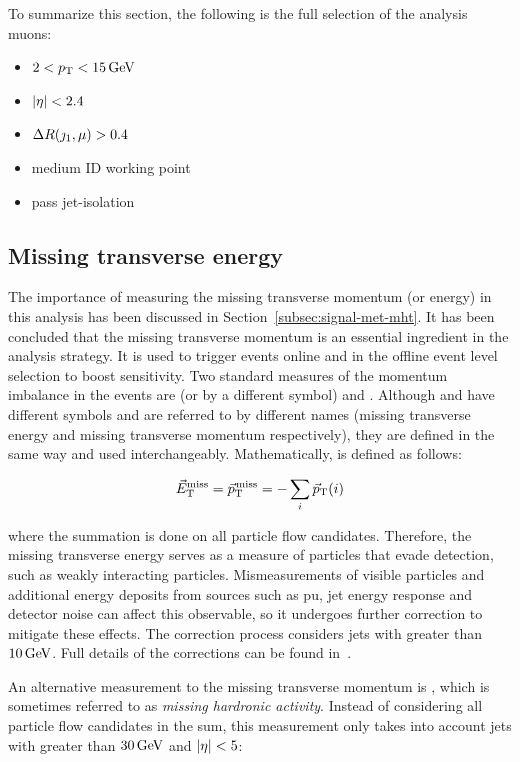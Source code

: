 To summarize this section, the following is the full selection of the analysis muons:

\begin{itemize}
\item $2<p_{\mathrm{T}}<15\,\text{Ge\hspace{-.08em}V}$
\item $\lvert \eta \rvert < 2.4$
\item $\Delta R(\jmath_1,\mu)>0.4$
\item medium ID working point
\item pass jet-isolation
\end{itemize}



\clearpage

\subsection{Missing transverse energy}
\label{subsec:met}

The importance of measuring the missing transverse momentum (or energy) in this analysis has been discussed in Section~\ref{subsec:signal-met-mht}. It has been concluded that the missing transverse momentum is an essential ingredient in the analysis strategy. It is used to trigger events online and in the offline event level selection to boost sensitivity. Two standard measures of the momentum imbalance in the events are \VEtmiss (or \ptvecmiss by a different symbol) and \htvecmiss. Although \VEtmiss and \ptvecmiss have different symbols and are referred to by different names (missing transverse energy and missing transverse momentum respectively), they are defined in the same way and used interchangeably. Mathematically, \VEtmiss is defined as follows:

\begin{equation}
{\vec E}_{\mathrm{T}}^{\text{miss}} = {\vec p}_{\mathrm{T}}^{\kern1pt\text{miss}} = -\sum_i {\vec p}_{\mathrm{T}}(i)
\end{equation}

where the summation is done on all particle flow candidates. Therefore, the missing transverse energy serves as a measure of particles that evade detection, such as weakly interacting particles. Mismeasurements of visible particles and additional energy deposits from sources such as \gls{pu}, jet energy response and detector noise can affect this observable, so it undergoes further correction to mitigate these effects. The correction process considers jets with \pt greater than $10\,\text{Ge\hspace{-.08em}V}$. Full details of the corrections can be found in~\cite{met_performance}.

An alternative measurement to the missing transverse momentum is \htvecmiss, which is sometimes referred to as \emph{missing hardronic activity}. Instead of considering all particle flow candidates in the sum, this measurement only takes into account jets with \pt greater than $30\,\text{Ge\hspace{-.08em}V}$ and $\lvert \eta \rvert<5$:

